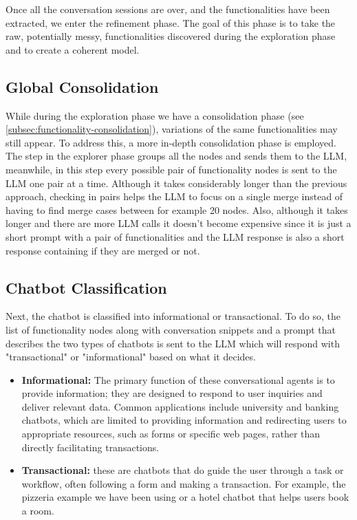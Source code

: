 Once all the conversation sessions are over,
and the functionalities have been extracted,
we enter the refinement phase.
The goal of this phase is to take the raw, potentially messy,
functionalities discovered during the exploration phase
and to create a coherent model.

\subsection{Global Consolidation}

While during the exploration phase we have a consolidation phase
(see \autoref{subsec:functionality-consolidation}),
variations of the same functionalities may still appear.
To address this, a more in-depth consolidation phase is employed.
The step in the explorer phase groups all the nodes
and sends them to the \ac{LLM},
meanwhile, in this step every possible pair of functionality nodes
is sent to the \ac{LLM} one pair at a time.
Although it takes considerably longer than the previous approach,
checking in pairs helps the \ac{LLM} to focus on a single merge
instead of having to find merge cases between for example 20 nodes.
Also, although it takes longer and there are more \ac{LLM} calls
it doesn't become expensive since it is just a short prompt
with a pair of functionalities
and the \ac{LLM} response is also a short response
containing if they are merged or not.

\subsection{Chatbot Classification}

Next, the chatbot is classified into informational or transactional.
To do so, the list of functionality nodes along with conversation snippets
and a prompt that describes the two types of chatbots
is sent to the \ac{LLM} which will respond with
"transactional" or "informational" based on what it decides.

\begin{itemize}
  \item \textbf{Informational:}
    The primary function of these conversational agents is to provide information;
    they are designed to respond to user inquiries and deliver relevant data.
    Common applications include university and banking chatbots,
    which are limited to providing information and
    redirecting users to appropriate resources,
    such as forms or specific web pages,
    rather than directly facilitating transactions.

  \item \textbf{Transactional:}
    these are chatbots that do guide the user
    through a task or workflow,
    often following a form and making a transaction.
    For example, the pizzeria example we have been using
    or a hotel chatbot that helps users book a room.
\end{itemize}

